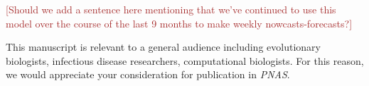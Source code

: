 \documentclass[stdletter,letterpaper,addrfromright,orderfromdateto,dateleft,11pt,noaddrto,sigleft]{newlfm}
\def\mfc#1{\textcolor{brown}{[#1]}}
\begin{document}
\begin{newlfm}
   \mfc{Should we add a sentence here mentioning that we've continued to use this model over the course of the last 9 months to make weekly nowcasts-forecasts?}

   This manuscript is relevant to a general audience including evolutionary biologists, infectious disease researchers, computational biologists.
   For this reason, we would appreciate your consideration for publication in \textit{PNAS}.
\end{newlfm}
\end{document}
